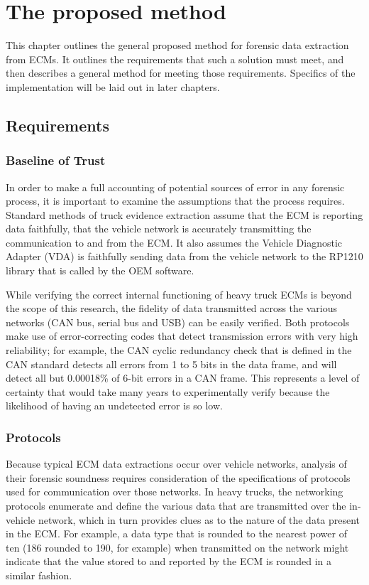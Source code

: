 \chapter{The proposed method}

This chapter outlines the general proposed method for forensic data extraction from ECMs. It outlines the requirements that such a solution must meet,
and then describes a general method for meeting those requirements. Specifics of the implementation will be laid out in later chapters.

\section{Requirements}

\subsection{Baseline of Trust}

In order to make a full accounting of potential sources of error in any forensic process, it is important to examine the assumptions that the process requires. Standard methods of 
truck evidence extraction assume that the ECM is reporting data faithfully, that the vehicle network is accurately transmitting the communication to and from the ECM. It also assumes 
the Vehicle Diagnostic Adapter (VDA) is faithfully sending data from the vehicle network to the RP1210 library that is called by the OEM software.

While verifying the correct internal functioning of heavy truck ECMs is beyond the scope of this research, the fidelity of data transmitted across the various networks (CAN bus, serial 
bus and USB) can be easily verified. Both protocols make use of error-correcting codes that detect transmission errors with very high reliability; for example, the CAN 
cyclic redundancy check that is defined in the CAN standard detects all errors from 1 to 5 bits in the data frame, and will detect all but 0.00018\% of 6-bit 
errors in a CAN frame\cite{koopman2004}. This represents a level of certainty that would take many years to experimentally verify because the likelihood of having an undetected error is so low.

\subsection{Protocols}

Because typical ECM data extractions occur over vehicle networks, analysis of their forensic soundness requires consideration of the specifications
of protocols  used for communication over those networks.
In heavy trucks, the networking protocols enumerate and define the various data that are transmitted over the in-vehicle network, which in turn provides clues as to the nature 
of the data present in the ECM. For example, a data type that is rounded to the nearest power of ten (186 rounded to 190, for example) when transmitted on the network might 
indicate that the value stored to and reported by the ECM is rounded in a similar fashion.

